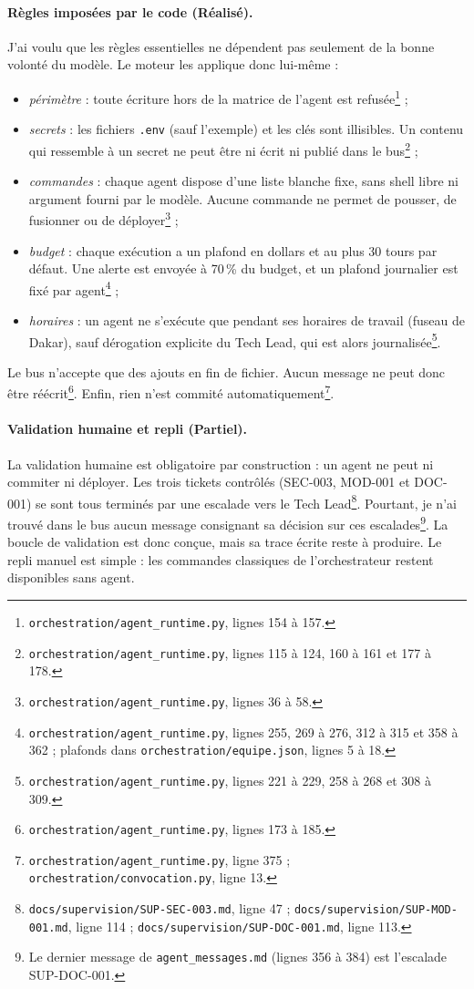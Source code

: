 \paragraph{Règles imposées par le code (Réalisé).} J'ai voulu que les règles essentielles ne dépendent pas seulement de la bonne volonté du modèle. Le moteur les applique donc lui-même :
\begin{itemize}
  \item \emph{périmètre} : toute écriture hors de la matrice de l'agent est refusée\footnote{\nolinkurl{orchestration/agent_runtime.py}, lignes 154 à 157.} ;
  \item \emph{secrets} : les fichiers \texttt{.env} (sauf l'exemple) et les clés sont illisibles. Un contenu qui ressemble à un secret ne peut être ni écrit ni publié dans le bus\footnote{\nolinkurl{orchestration/agent_runtime.py}, lignes 115 à 124, 160 à 161 et 177 à 178.} ;
  \item \emph{commandes} : chaque agent dispose d'une liste blanche fixe, sans shell libre ni argument fourni par le modèle. Aucune commande ne permet de pousser, de fusionner ou de déployer\footnote{\nolinkurl{orchestration/agent_runtime.py}, lignes 36 à 58.} ;
  \item \emph{budget} : chaque exécution a un plafond en dollars et au plus 30 tours par défaut. Une alerte est envoyée à 70\,\% du budget, et un plafond journalier est fixé par agent\footnote{\nolinkurl{orchestration/agent_runtime.py}, lignes 255, 269 à 276, 312 à 315 et 358 à 362 ; plafonds dans \nolinkurl{orchestration/equipe.json}, lignes 5 à 18.} ;
  \item \emph{horaires} : un agent ne s'exécute que pendant ses horaires de travail (fuseau de Dakar), sauf dérogation explicite du Tech Lead, qui est alors journalisée\footnote{\nolinkurl{orchestration/agent_runtime.py}, lignes 221 à 229, 258 à 268 et 308 à 309.}.
\end{itemize}
Le bus n'accepte que des ajouts en fin de fichier. Aucun message ne peut donc être réécrit\footnote{\nolinkurl{orchestration/agent_runtime.py}, lignes 173 à 185.}. Enfin, rien n'est commité automatiquement\footnote{\nolinkurl{orchestration/agent_runtime.py}, ligne 375 ; \nolinkurl{orchestration/convocation.py}, ligne 13.}.

\paragraph{Validation humaine et repli (Partiel).} La validation humaine est obligatoire par construction : un agent ne peut ni commiter ni déployer. Les trois tickets contrôlés (SEC-003, MOD-001 et DOC-001) se sont tous terminés par une escalade vers le Tech Lead\footnote{\nolinkurl{docs/supervision/SUP-SEC-003.md}, ligne 47 ; \nolinkurl{docs/supervision/SUP-MOD-001.md}, ligne 114 ; \nolinkurl{docs/supervision/SUP-DOC-001.md}, ligne 113.}. Pourtant, je n'ai trouvé dans le bus aucun message consignant sa décision sur ces escalades\footnote{Le dernier message de \nolinkurl{agent_messages.md} (lignes 356 à 384) est l'escalade SUP-DOC-001.}. La boucle de validation est donc conçue, mais sa trace écrite reste à produire. Le repli manuel est simple : les commandes classiques de l'orchestrateur restent disponibles sans agent.

